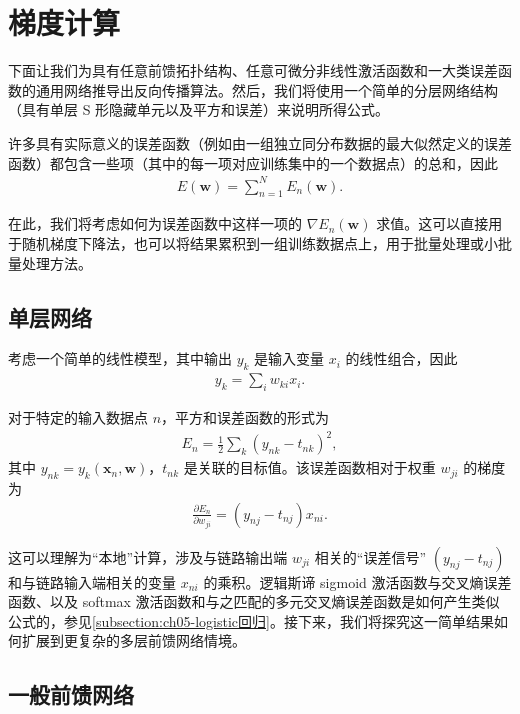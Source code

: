 \documentclass[../../main.tex]{subfiles}
\begin{document}
\section{梯度计算}\label{section:ch08-梯度计算}

下面让我们为具有任意前馈拓扑结构、任意可微分非线性激活函数和一大类误差函数的通用网络推导出反向传播算法。然后，我们将使用一个简单的分层网络结构（具有单层 S 形隐藏单元以及平方和误差）来说明所得公式。

许多具有实际意义的误差函数（例如由一组独立同分布数据的最大似然定义的误差函数）都包含一些项（其中的每一项对应训练集中的一个数据点）的总和，因此
\begin{align}
E(\mathbf{w})=\sum_{n=1}^{N}E_n(\mathbf{w}).
\label{align:ch08-误差分解}
\end{align}

在此，我们将考虑如何为误差函数中这样一项的 $\nabla E_n(\mathbf{w})$ 求值。这可以直接用于随机梯度下降法，也可以将结果累积到一组训练数据点上，用于批量处理或小批量处理方法。

\subsection{单层网络}\label{subsection:ch08-单层网络}

考虑一个简单的线性模型，其中输出 $y_k$ 是输入变量 $x_i$ 的线性组合，因此
\begin{align}
y_k=\sum_{i}w_{ki}x_i.
\label{align:ch08-单层输出}
\end{align}

对于特定的输入数据点 $n$，平方和误差函数的形式为
\begin{align}
E_n=\frac{1}{2}\sum_{k}\left(y_{nk}-t_{nk}\right)^{2},
\label{align:ch08-单层误差}
\end{align}
其中 $y_{nk}=y_k(\mathbf{x}_n,\mathbf{w})$，$t_{nk}$ 是关联的目标值。该误差函数相对于权重 $w_{ji}$ 的梯度为
\begin{align}
\frac{\partial E_n}{\partial w_{ji}}=\left(y_{nj}-t_{nj}\right)x_{ni}.
\label{align:ch08-单层梯度}
\end{align}

这可以理解为“本地”计算，涉及与链路输出端 $w_{ji}$ 相关的“误差信号” $(y_{nj}-t_{nj})$ 和与链路输入端相关的变量 $x_{ni}$ 的乘积。逻辑斯谛 sigmoid 激活函数与交叉熵误差函数、以及 softmax 激活函数和与之匹配的多元交叉熵误差函数是如何产生类似公式的，参见\cref{subsection:ch05-logistic回归}。接下来，我们将探究这一简单结果如何扩展到更复杂的多层前馈网络情境。

\subsection{一般前馈网络}\label{subsection:ch08-一般前馈网络}
\end{document}
